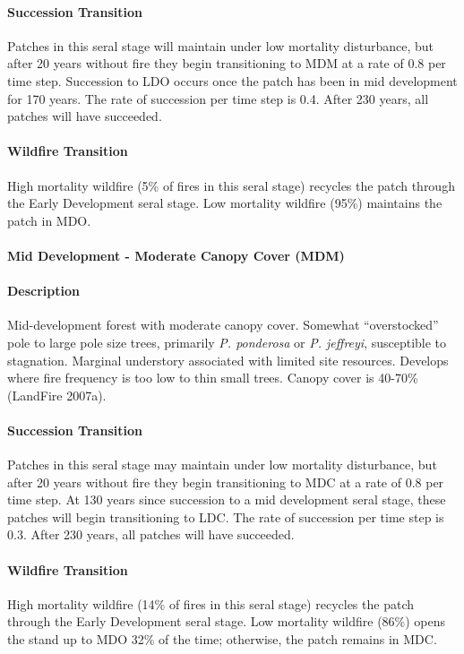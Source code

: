 \paragraph{Succession Transition} Patches in this seral stage will maintain under low mortality disturbance, but after 20 years without fire they begin transitioning to MDM at a rate of 0.8 per time step. Succession to LDO occurs once the patch has been in mid development for 170 years. The rate of succession per time step is 0.4. After 230 years, all patches will have succeeded.

\paragraph{Wildfire Transition} High mortality wildfire (5\% of fires in this seral stage) recycles the patch through the Early Development seral stage. Low mortality wildfire (95\%) maintains the patch in MDO.

\noindent\hrulefill

\paragraph{Mid Development - Moderate Canopy Cover (MDM)}

\paragraph{Description} Mid-development forest with moderate canopy cover. Somewhat ``overstocked'' pole to large pole size trees, primarily \emph{P. ponderosa} or \emph{P. jeffreyi}, susceptible to stagnation. Marginal understory associated with limited site resources. Develops where fire frequency is too low to thin small trees. Canopy cover is 40-70\% (LandFire 2007a).

\paragraph{Succession Transition} Patches in this seral stage may maintain under low mortality disturbance, but after 20 years without fire they begin transitioning to MDC at a rate of 0.8 per time step. At 130 years since succession to a mid development seral stage, these patches will begin transitioning to LDC. The rate of succession per time step is 0.3. After 230 years, all patches will have succeeded.

\paragraph{Wildfire Transition} High mortality wildfire (14\% of fires in this seral stage) recycles the patch through the Early Development seral stage. Low mortality wildfire (86\%) opens the stand up to MDO 32\% of the time; otherwise, the patch remains in MDC.

